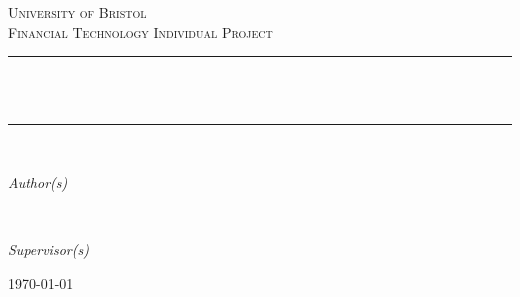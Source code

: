 \begin{titlepage}
  	\newcommand{\HRule}{\rule{\linewidth}{0.3mm}} %
	\center %
	
	\textsc{\LARGE University of Bristol}\\[1cm]
	
	\textsc{\Large Financial Technology Individual Project}\\[0.5cm]
	
	
	
	\HRule\\[0.4cm]
	
	{\huge\bfseries \@title}\\[0.4cm]
	
	\HRule\\[1.5cm]
	
	\begin{minipage}{0.4\textwidth}
		\begin{flushleft}
			\large
			\textit{Author(s)}\\
			\@author %
		\end{flushleft}
	\end{minipage}
	~
	\begin{minipage}{0.4\textwidth}
		\begin{flushright}
			\large
			\textit{Supervisor(s)}\\
			\supervisors %
		\end{flushright}
	\end{minipage}
	
	
	
	\vfill\vfill
		{\large\today} %
    \vfill\vfill
	

\end{titlepage}

